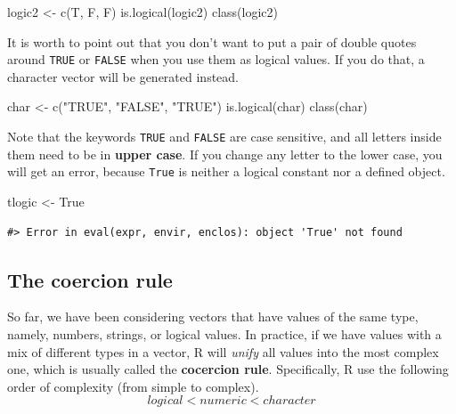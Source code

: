 \documentclass[
]{book}
\newenvironment{Shaded}{\begin{snugshade}}{\end{snugshade}}
\newcommand{\FunctionTok}[1]{\textcolor[rgb]{0.00,0.00,0.00}{#1}}
\newcommand{\NormalTok}[1]{#1}
\newcommand{\OtherTok}[1]{\textcolor[rgb]{0.56,0.35,0.01}{#1}}
\newcommand{\StringTok}[1]{\textcolor[rgb]{0.31,0.60,0.02}{#1}}
\begin{document}
\begin{Shaded}
\begin{Highlighting}[]
\NormalTok{logic2 }\OtherTok{\textless{}{-}} \FunctionTok{c}\NormalTok{(T, F, F)}
\FunctionTok{is.logical}\NormalTok{(logic2)}
\FunctionTok{class}\NormalTok{(logic2)}
\end{Highlighting}
\end{Shaded}

It is worth to point out that you don't want to put a pair of double quotes around \texttt{TRUE} or \texttt{FALSE} when you use them as logical values. If you do that, a character vector will be generated instead.

\begin{Shaded}
\begin{Highlighting}[]
\NormalTok{char }\OtherTok{\textless{}{-}} \FunctionTok{c}\NormalTok{(}\StringTok{"TRUE"}\NormalTok{, }\StringTok{"FALSE"}\NormalTok{, }\StringTok{"TRUE"}\NormalTok{)}
\FunctionTok{is.logical}\NormalTok{(char)}
\FunctionTok{class}\NormalTok{(char)}
\end{Highlighting}
\end{Shaded}

Note that the keywords \texttt{TRUE} and \texttt{FALSE} are case sensitive, and all letters inside them need to be in \textbf{upper case}. If you change any letter to the lower case, you will get an error, because \texttt{True} is neither a logical constant nor a defined object.

\begin{Shaded}
\begin{Highlighting}[]
\NormalTok{tlogic }\OtherTok{\textless{}{-}}\NormalTok{ True}
\end{Highlighting}
\end{Shaded}

\begin{verbatim}
#> Error in eval(expr, envir, enclos): object 'True' not found
\end{verbatim}

\hypertarget{the-coercion-rule}{%
\subsection{\texorpdfstring{\textbf{The coercion rule}}{The coercion rule}}\label{the-coercion-rule}}

So far, we have been considering vectors that have values of the same type, namely, numbers, strings, or logical values. In practice, if we have values with a mix of different types in a vector, R will \emph{unify} all values into the most complex one, which is usually called the \textbf{cocercion rule}. Specifically, R use the following order of complexity (from simple to complex).
\[logical < numeric < character\]
\end{document}
